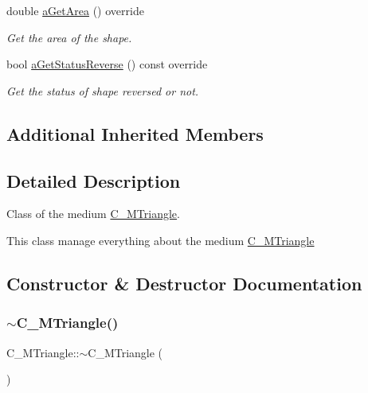 \begin{DoxyCompactItemize}
double \hyperlink{classC__MTriangle_a1baff5085fc1b9822987e3fc307550ce}{a\+Get\+Area} () override
\begin{DoxyCompactList}\small\item\em Get the area of the shape. \end{DoxyCompactList}\item 
bool \hyperlink{classC__MTriangle_a5c0488c23e9e64750bb879d0394830b2}{a\+Get\+Status\+Reverse} () const override
\begin{DoxyCompactList}\small\item\em Get the status of shape reversed or not. \end{DoxyCompactList}\end{DoxyCompactItemize}
\subsection*{Additional Inherited Members}


\subsection{Detailed Description}
Class of the medium \hyperlink{classC__MTriangle}{C\+\_\+\+M\+Triangle}. 

This class manage everything about the medium \hyperlink{classC__MTriangle}{C\+\_\+\+M\+Triangle} 

\subsection{Constructor \& Destructor Documentation}
\mbox{\label{classC__MTriangle_afec9368409c7a8bfd03cd0e735e1eee7}} 
\subsubsection{\texorpdfstring{$\sim$\+C\+\_\+\+M\+Triangle()}{~C\_MTriangle()}}
{\footnotesize\ttfamily C\+\_\+\+M\+Triangle\+::$\sim$\+C\+\_\+\+M\+Triangle (\begin{DoxyParamCaption}{ }\end{DoxyParamCaption})\hspace{0.3cm}{\ttfamily [override]}}



